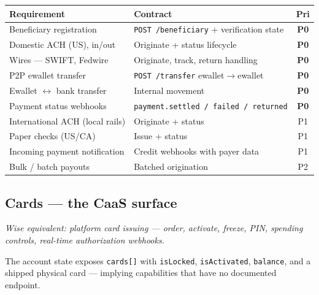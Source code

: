 \documentclass[11pt]{article}
\newcommand{\ep}[1]{\texttt{\small #1}}
\newcommand{\pri}[1]{\textbf{#1}}
\begin{document}
\begin{table}[H]
\centering
\small
\begin{tabular}{@{}p{5.4cm}p{7.2cm}c@{}}
\toprule
\textbf{Requirement} & \textbf{Contract} & \textbf{Pri} \\
\midrule
Beneficiary registration & \ep{POST /beneficiary} + verification state & \pri{P0} \\
Domestic ACH (US), in/out & Originate + status lifecycle & \pri{P0} \\
Wires --- SWIFT, Fedwire & Originate, track, return handling & \pri{P0} \\
P2P ewallet transfer & \ep{POST /transfer} ewallet$\rightarrow$ewallet & \pri{P0} \\
Ewallet $\leftrightarrow$ bank transfer & Internal movement & \pri{P0} \\
Payment status webhooks & \ep{payment.settled / failed / returned} & \pri{P0} \\
International ACH (local rails) & Originate + status & P1 \\
Paper checks (US/CA) & Issue + status & P1 \\
Incoming payment notification & Credit webhooks with payer data & P1 \\
Bulk / batch payouts & Batched origination & P2 \\
\bottomrule
\end{tabular}
\end{table}

\subsection{Cards --- the CaaS surface}\label{sec:cards}

\emph{Wise equivalent: platform card issuing --- order, activate, freeze, PIN, spending controls, real-time authorization webhooks.}

The account state exposes \ep{cards[]} with \ep{isLocked}, \ep{isActivated}, \ep{balance}, and a shipped physical card --- implying capabilities that have no documented endpoint.
\end{document}
